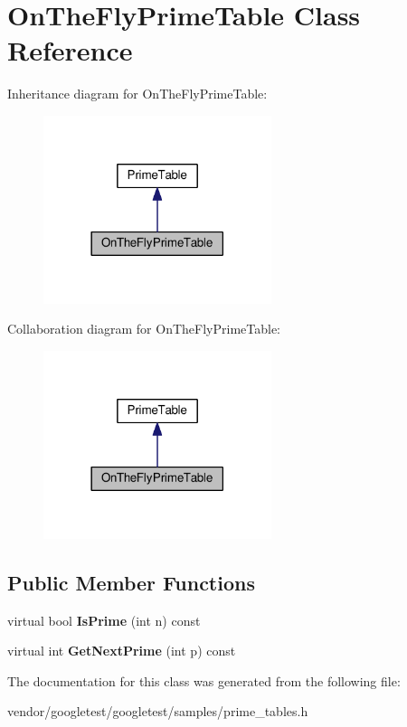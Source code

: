 \hypertarget{classOnTheFlyPrimeTable}{}\section{On\+The\+Fly\+Prime\+Table Class Reference}
\label{classOnTheFlyPrimeTable}


Inheritance diagram for On\+The\+Fly\+Prime\+Table\+:\nopagebreak
\begin{figure}[H]
\begin{center}
\leavevmode
\includegraphics[width=189pt]{classOnTheFlyPrimeTable__inherit__graph}
\end{center}
\end{figure}


Collaboration diagram for On\+The\+Fly\+Prime\+Table\+:\nopagebreak
\begin{figure}[H]
\begin{center}
\leavevmode
\includegraphics[width=189pt]{classOnTheFlyPrimeTable__coll__graph}
\end{center}
\end{figure}
\subsection*{Public Member Functions}
\begin{DoxyCompactItemize}
\item 
virtual bool {\bfseries Is\+Prime} (int n) const \hypertarget{classOnTheFlyPrimeTable_a40ad721709e2b6fdf550c19680869d6b}{}\label{classOnTheFlyPrimeTable_a40ad721709e2b6fdf550c19680869d6b}

\item 
virtual int {\bfseries Get\+Next\+Prime} (int p) const \hypertarget{classOnTheFlyPrimeTable_a9c5d9e00ed58d56dcf899a2f9eb0e544}{}\label{classOnTheFlyPrimeTable_a9c5d9e00ed58d56dcf899a2f9eb0e544}

\end{DoxyCompactItemize}


The documentation for this class was generated from the following file\+:\begin{DoxyCompactItemize}
\item 
vendor/googletest/googletest/samples/prime\+\_\+tables.\+h\end{DoxyCompactItemize}
